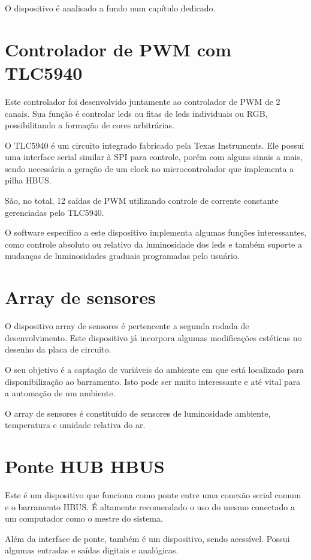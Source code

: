\documentclass[11pt]{report}
\begin{document}
O dispositivo é analisado a fundo num capítulo dedicado.

\section{Controlador de PWM com TLC5940}

Este controlador foi desenvolvido juntamente ao controlador de PWM de 2 canais. Sua função é controlar leds ou fitas de leds individuais ou RGB, possibilitando a formação de cores arbitrárias.

O TLC5940 é um circuito integrado fabricado pela Texas Instruments. Ele possui uma interface serial similar à SPI para controle, porém com alguns sinais a mais, sendo necessária a geração de um clock no microcontrolador que implementa a pilha HBUS.

São, no total, 12 saídas de PWM utilizando controle de corrente constante gerenciadas pelo TLC5940.

O software específico a este dispositivo implementa algumas funções interessantes, como controle absoluto ou relativo da luminosidade dos leds e também suporte a mudanças de luminosidades graduais programadas pelo usuário.

\section{Array de sensores}

O dispositivo array de sensores é pertencente a segunda rodada de desenvolvimento. Este dispositivo já incorpora algumas modificações estéticas no desenho da placa de circuito.

O seu objetivo é a captação de variáveis do ambiente em que está localizado para disponibilização ao barramento. Isto pode ser muito interessante e até vital para a automação de um ambiente.

O array de sensores é constituído de sensores de luminosidade ambiente, temperatura e umidade relativa do ar.

\section{Ponte HUB HBUS}

Este é um dispositivo que funciona como ponte entre uma conexão serial comum e o barramento HBUS. É altamente recomendado o uso do mesmo conectado a um computador como o mestre do sistema.

Além da interface de ponte, também é um dispositivo, sendo acessível. Possui algumas entradas e saídas digitais e analógicas.
\end{document}
